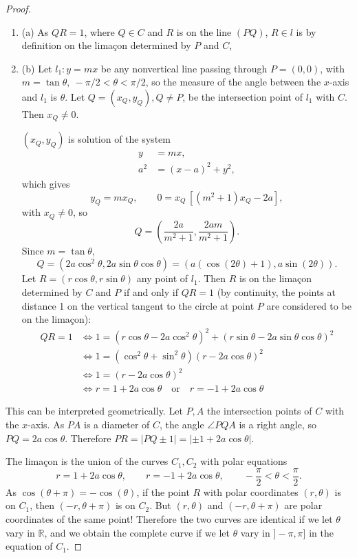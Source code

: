 \documentclass[11pt,a4paper]{article}
\newcommand{\be} {\begin{enumerate}}
\newcommand{\ee} {\end{enumerate}}
\newcommand{\R}{\mathbb{R}}
\begin{document}
\begin{proof}
\be
\item[(a)]  As $QR = 1$, where $Q \in C$ and $R$ is on the line $(PQ)$, $R\in l$ is by definition on the lima\c con determined by $P$ and $C$,

\item[(b)] Let $l_1 : y = mx$ be any nonvertical line passing through $P = (0,0)$, with $m = \tan \theta, \ -\pi / 2 <\theta < \pi/2$, so the measure of the angle between the $x$-axis and $l_1$ is $\theta$.  Let $Q =(x_Q,y_Q),Q \ne P$, be the intersection point of $l_1$ with $C$. Then $x_Q \ne 0$.

$(x_Q,y_Q)$ is solution of the system
\begin{align*}
y &= mx,\\
a^2 &=(x-a)^2 + y^2, 
\end{align*}
which gives $$y_Q = mx_Q,\qquad 0 = x_Q\, [(m^2+1)x_Q - 2a],$$ with $x_Q \ne 0$, so
$$Q = \left(\frac{2a}{m^2+1}, \frac{2am}{m^2+1}\right).$$
Since $m = \tan \theta$,
$$ Q = (2a \cos^2 \theta, 2a \sin \theta \cos \theta) = (a (\cos(2\theta)+1), a \sin(2\theta)).$$
Let $R = (r\cos \theta, r\sin \theta)$ any point of $l_1$.
Then $R$ is on the lima\c con determined by $C$ and $P$ if and only if $QR = 1$ (by continuity, the points at distance 1 on the vertical tangent to the circle at point $P$ are considered to be on the lima\c con):
\begin{align*}
QR = 1 &\iff 1 = (r \cos \theta - 2a \cos^2 \theta)^2 + (r \sin \theta  - 2 a \sin \theta \cos \theta)^2\\
&\iff 1 = (\cos^2 \theta + \sin^2 \theta)(r - 2 a \cos \theta)^2\\
&\iff 1 =(r - 2 a \cos \theta)^2\\
&\iff r = 1 + 2a \cos \theta \quad \mathrm{or} \quad r = -1 + 2a \cos \theta
\end{align*}
\ee
This can be interpreted geometrically. Let $P,A$ the intersection points of $C$ with the $x$-axis. As $PA$ is a diameter of $C$, the angle $\angle PQA$ is a right angle, so $PQ = 2a \cos \theta$. Therefore $PR = | PQ \pm 1| = |\pm 1 + 2a \cos \theta|$.

The lima\c con is the union of the curves $C_1,C_2$ with polar equations
$$ r = 1 + 2a \cos \theta, \qquad  r = -1 + 2a \cos \theta, \qquad -\frac{\pi}{2} < \theta < \frac{\pi}{2}.$$
As $\cos(\theta + \pi) = - \cos(\theta)$, if the point $R$ with polar coordinates $(r, \theta)$ is on $C_1$, then $(-r, \theta + \pi)$ is on $C_2$. But $(r,\theta)$ and  $(-r,\theta + \pi)$ are polar coordinates of the same point!  Therefore the two curves are identical if we let $\theta$ vary in $\R$, and we obtain the complete curve if we let $\theta$ vary in $]-\pi,\pi]$ in the equation of $C_1$.


\end{proof}
\end{document}

